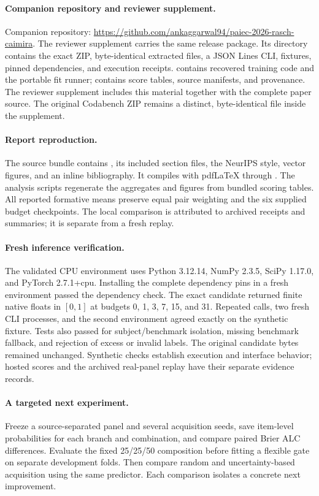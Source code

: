 \paragraph{Companion repository and reviewer supplement.}
Companion repository: \url{https://github.com/ankaggarwal94/paiec-2026-rasch-caimira}. The reviewer supplement carries the same release package. Its  directory contains the exact ZIP, byte-identical extracted files, a JSON Lines CLI, fixtures, pinned dependencies, and execution receipts.  contains recovered training code and the portable fit runner;  contains score tables, source manifests, and provenance. The reviewer supplement includes this material together with the complete paper source. The original Codabench ZIP remains a distinct, byte-identical file inside the supplement.

\paragraph{Report reproduction.}
The source bundle contains , its included section files, the NeurIPS style, vector figures, and an inline bibliography. It compiles with pdfLaTeX through . The analysis scripts regenerate the aggregates and figures from bundled scoring tables. All reported formative means preserve equal pair weighting and the six supplied budget checkpoints. The local comparison is attributed to archived receipts and summaries; it is separate from a fresh replay.

\paragraph{Fresh inference verification.}
The validated CPU environment uses Python 3.12.14, NumPy 2.3.5, SciPy 1.17.0, and PyTorch 2.7.1+cpu. Installing the complete dependency pins in a fresh environment passed the dependency check. The exact candidate returned finite native floats in $[0,1]$ at budgets 0, 1, 3, 7, 15, and 31. Repeated calls, two fresh CLI processes, and the second environment agreed exactly on the synthetic fixture. Tests also passed for subject/benchmark isolation, missing benchmark fallback, and rejection of excess or invalid labels. The original candidate bytes remained unchanged. Synthetic checks establish execution and interface behavior; hosted scores and the archived real-panel replay have their separate evidence records.

\paragraph{A targeted next experiment.}
Freeze a source-separated panel and several acquisition seeds, save item-level probabilities for each branch and combination, and compare paired Brier ALC differences. Evaluate the fixed 25/25/50 composition before fitting a flexible gate on separate development folds. Then compare random and uncertainty-based acquisition using the same predictor. Each comparison isolates a concrete next improvement.

